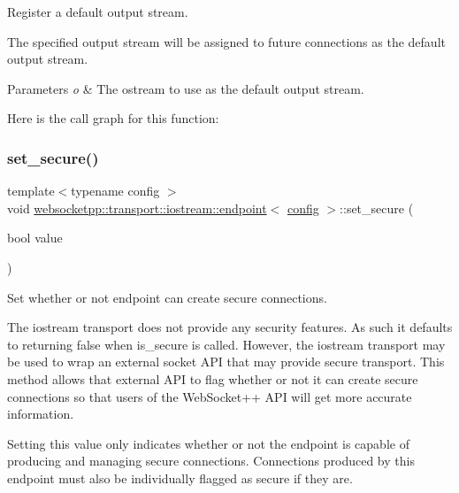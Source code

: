 Register a default output stream. 

The specified output stream will be assigned to future connections as the default output stream.


\begin{DoxyParams}{Parameters}
{\em o} & The ostream to use as the default output stream. \\
\hline
\end{DoxyParams}
Here is the call graph for this function\+:
\mbox{\label{classwebsocketpp_1_1transport_1_1iostream_1_1endpoint_ae6488ca0ead1ce09a60e16a896162ad5}} 
\subsubsection{\texorpdfstring{set\+\_\+secure()}{set\_secure()}}
{\footnotesize\ttfamily template$<$typename config $>$ \\
void \mbox{\hyperlink{classwebsocketpp_1_1transport_1_1iostream_1_1endpoint}{websocketpp\+::transport\+::iostream\+::endpoint}}$<$ \mbox{\hyperlink{classconfig}{config}} $>$\+::set\+\_\+secure (\begin{DoxyParamCaption}\item[{bool}]{value }\end{DoxyParamCaption})\hspace{0.3cm}{\ttfamily [inline]}}



Set whether or not endpoint can create secure connections. 

The iostream transport does not provide any security features. As such it defaults to returning false when {\ttfamily is\+\_\+secure} is called. However, the iostream transport may be used to wrap an external socket A\+PI that may provide secure transport. This method allows that external A\+PI to flag whether or not it can create secure connections so that users of the Web\+Socket++ A\+PI will get more accurate information.

Setting this value only indicates whether or not the endpoint is capable of producing and managing secure connections. Connections produced by this endpoint must also be individually flagged as secure if they are.

